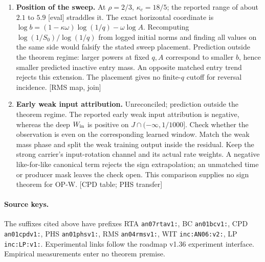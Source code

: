 \documentclass[10pt,twocolumn]{article}
\newcommand{\src}[1]{\textnormal{\small [#1]}}
\begin{document}
\begin{enumerate}
\item \textbf{Position of the sweep.}
At \(\rho=2/3\), \(\kappa_c=18/5\); the reported range of about
\(2.1\) to \(5.9\) [eval] straddles it. The exact horizontal
coordinate is \(\log b=(1-\kappa\omega)\log(1/q)-\omega\log A\).
Recomputing \(\log(1/S_0)/\log(1/q)\) from logged initial norms
and finding all values on the same side would falsify the stated
sweep placement. Prediction outside the theorem regime: larger
powers at fixed \(q,A\) correspond to smaller \(b\), hence smaller
predicted inactive entry mass. An opposite matched entry trend
rejects this extension. The placement gives no finite-\(q\) cutoff
for reversal incidence. \src{RMS map, join}

\item \textbf{Early weak input attribution.}
Unreconciled; prediction outside the theorem regime. The reported
early weak input attribution is negative, whereas the deep
\(W_{\rm in}\) is positive on \(J\cap(-\infty,1/1000]\).
Check whether the observation is even on the corresponding learned
window. Match the weak mass phase and split the weak training output
inside the residual. Keep the strong carrier's input-rotation
channel and its actual rate weights. A negative like-for-like
canonical term rejects the sign extrapolation; an unmatched time
or producer mask leaves the check open. This comparison supplies
no sign theorem for OP-W. \src{CPD table; PHS transfer}
\end{enumerate}
\paragraph{Source keys.}
The suffixes cited above have prefixes RTA \texttt{an07rtav1:},
BC \texttt{an01bcv1:}, CPD \texttt{an01cpdv1:}, PHS \texttt{an01phsv1:},
RMS \texttt{an04rmsv1:}, WIT \texttt{inc:AN06:v2:},
LP \texttt{inc:LP:v1:}. Experimental links follow the roadmap v1.36
experiment interface. Empirical measurements enter no theorem premise.
\end{document}
